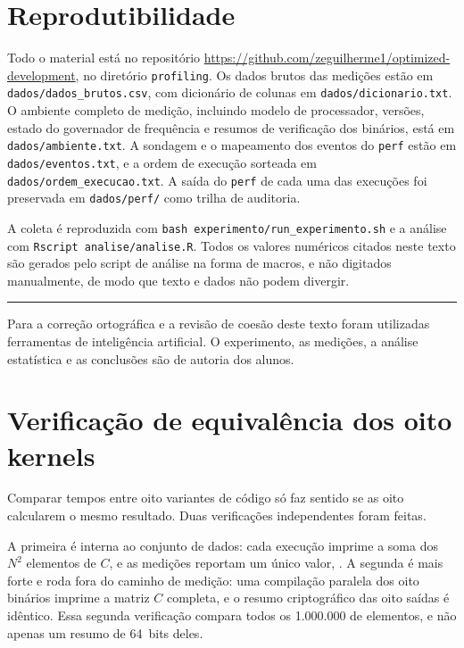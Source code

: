 \documentclass[11pt,a4paper]{article}
\begin{document}
\section{Reprodutibilidade}

\begin{sloppypar}
Todo o material está no repositório
\url{https://github.com/zeguilherme1/optimized-development}, no diretório
\texttt{profiling}. Os dados brutos das
\valMedicoes{} medições estão em \texttt{dados/dados\_brutos.csv}, com dicionário de
colunas em \texttt{dados/dicionario.txt}. O ambiente completo de medição, incluindo modelo
de processador, versões, estado do governador de frequência e resumos de verificação dos
binários, está em \texttt{dados/ambiente.txt}. A sondagem e o mapeamento dos eventos do
\texttt{perf} estão em \texttt{dados/eventos.txt}, e a ordem de execução sorteada em
\texttt{dados/ordem\_execucao.txt}. A saída do \texttt{perf} de cada uma das
\valMedicoes{} execuções foi preservada em \texttt{dados/perf/} como trilha de auditoria.
\end{sloppypar}

A coleta é reproduzida com \texttt{bash experimento/run\_experimento.sh} e a análise com
\texttt{Rscript analise/analise.R}. Todos os valores numéricos citados neste texto são
gerados pelo script de análise na forma de macros, e não digitados manualmente, de modo
que texto e dados não podem divergir.

\vspace{1em}
\noindent\rule{\textwidth}{0.4pt}

\vspace{0.5em}
\noindent\small Para a correção ortográfica e a revisão de coesão deste texto foram
utilizadas ferramentas de inteligência artificial. O experimento, as medições, a análise
estatística e as conclusões são de autoria dos alunos.

\appendix

\section{Verificação de equivalência dos oito kernels}
\label{ap:validade}

Comparar tempos entre oito variantes de código só faz sentido se as oito calcularem o
mesmo resultado. Duas verificações independentes foram feitas.

A primeira é interna ao conjunto de dados: cada execução imprime a soma dos $N^2$
elementos de $C$, e as \valMedicoes{} medições reportam um único valor,
\valChecksum. A segunda é mais forte e roda fora do caminho de medição: uma compilação
paralela dos oito binários imprime a matriz $C$ completa, e o resumo criptográfico das
oito saídas é idêntico. Essa segunda verificação compara todos os
1.000.000 de elementos, e não apenas um resumo de 64~bits deles.
\end{document}
